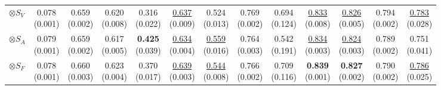 \documentclass[conference,a4paper]{APSIPA2025}
\begin{document}
\begin{table}[h!]
{\begin{tabular}{l|cc|cccc|cccccc}
\hspace{6px}$\otimes S_{V}$ & \makecell{0.078 \\ (0.001)} & \makecell{0.659 \\ (0.002)} & \makecell{0.620 \\ (0.008)} & \makecell{0.316 \\ (0.022)} & \makecell{\underline{0.637} \\ (0.009)} & \makecell{0.524 \\ (0.013)} & \makecell{0.769 \\ (0.002)} & \makecell{0.694 \\ (0.124)} & \makecell{\underline{0.833} \\ (0.008)} & \makecell{\underline{0.826} \\ (0.005)} & \makecell{0.794 \\ (0.002)} & \makecell{\underline{0.783} \\ (0.028)} \\
\hspace{8px}$\otimes S_{A}$ & \makecell{0.079 \\ (0.001)} & \makecell{0.659 \\ (0.002)} & \makecell{0.617 \\ (0.005)} & \makecell{\textbf{0.425} \\ (0.039)} & \makecell{\underline{0.634} \\ (0.004)} & \makecell{\underline{0.559} \\ (0.016)} & \makecell{0.764 \\ (0.003)} & \makecell{0.542 \\ (0.191)} & \makecell{\underline{0.834} \\ (0.003)} & \makecell{\underline{0.824} \\ (0.003)} & \makecell{0.789 \\ (0.002)} & \makecell{0.751 \\ (0.041)} \\
\hspace{10px}$\otimes S_{F}$ & \makecell{0.078 \\ (0.001)} & \makecell{0.660 \\ (0.003)} & \makecell{0.623 \\ (0.004)} & \makecell{0.370 \\ (0.017)} & \makecell{\underline{0.639} \\ (0.003)} & \makecell{\underline{0.544} \\ (0.008)} & \makecell{0.766 \\ (0.002)} & \makecell{0.709 \\ (0.116)} & \makecell{\textbf{0.839} \\ (0.001)} & \makecell{\textbf{0.827} \\ (0.002)} & \makecell{0.790 \\ (0.002)} & \makecell{\underline{0.786} \\ (0.025)} \\

\end{tabular}}
\end{table}
\end{document}
